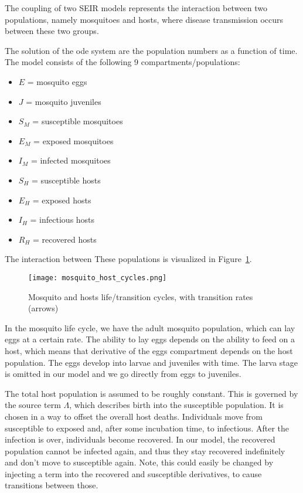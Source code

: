 \documentclass{article}
\begin{document}
The coupling of two SEIR models represents the interaction between two populations, namely mosquitoes and hosts, 
where disease transmission occurs between these two groups.

The solution of the ode system are the population numbers as a function of time.  
The model consists of the following 9 compartments/populations:

\begin{itemize}
    \item \( E \) = mosquito eggs
    \item \( J \) = mosquito juveniles
    \item \( S_M \) = susceptible mosquitoes
    \item \( E_M \) = exposed mosquitoes
    \item \( I_M \) = infected mosquitoes
    \item \( S_H \) = susceptible hosts
    \item \( E_H \) = exposed hosts
    \item \( I_H \) = infectious hosts
    \item \( R_H \) = recovered hosts
\end{itemize}

The interaction between These populations is visualized in Figure~\ref{mosquito_host_cycles}.
\begin{figure}
    \centering
    \texttt{[image: mosquito\_host\_cycles.png]}
    \caption{Mosquito and hosts life/transition cycles, with transition rates (arrows) \cite{Heidecke2024.09.16.613097}}
    \label{mosquito_host_cycles}
\end{figure}

In the mosquito life cycle, we have the adult mosquito population, which can lay eggs at a certain rate. 
The ability to lay eggs depends on the ability to feed on a host, which means that derivative of the
eggs compartment depends on the host population. The eggs develop into larvae and juveniles with time. 
The larva stage is omitted in our model and we go directly from eggs to juveniles. 

The total host population is assumed to be roughly constant. This is governed by the source term $\Lambda$,
which describes birth into the susceptible population. It is chosen in a way to offset the overall host deaths. 
Individuals move from susceptible to exposed and, after some incubation time, to infectious. After 
the infection is over, individuals become recovered. In our model, the recovered population cannot 
be infected again, and thus they stay recovered indefinitely and don't move to susceptible again. Note, 
this could easily be changed by injecting a term into the recovered and susceptible derivatives, to cause 
transitions between those.
\end{document}
